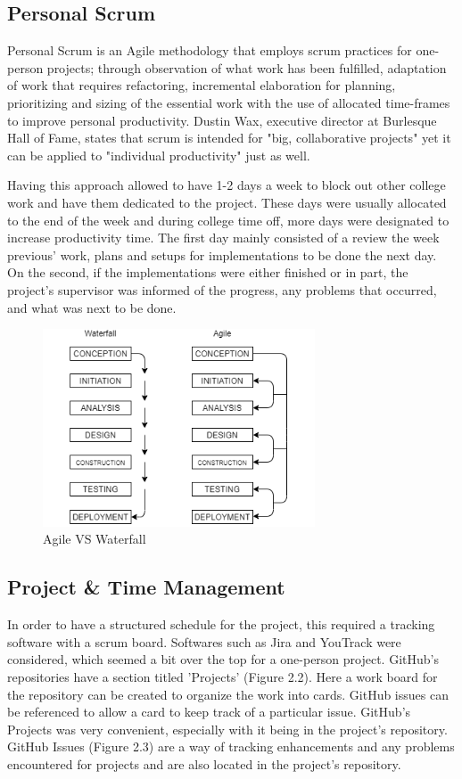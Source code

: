 \subsection{Personal Scrum}
Personal Scrum is an Agile methodology that employs scrum practices for one-person projects; through observation of what work has been fulfilled, adaptation of work that requires refactoring, incremental elaboration for planning, prioritizing and sizing of the essential work with the use of allocated time-frames to improve personal productivity. \cite{ref5}
Dustin Wax, executive director at Burlesque Hall of Fame, states that scrum is intended for "big, collaborative projects" yet it can be applied to "individual productivity" just as well. \cite{ref5}
 
Having this approach allowed to have 1-2 days a week to block out other college work and have them dedicated to the project. These days were usually allocated to the end of the week and during college time off, more days were designated to increase productivity time. The first day mainly consisted of a review the week previous' work, plans and setups for implementations to be done the next day. On the second, if the implementations were either finished or in part, the project's supervisor was informed of the progress, any problems that occurred, and what was next to be done.

\begin{figure}[H]
    \caption{Agile VS Waterfall}
    \label{image:agileVSwaterfall}
    \centering
    \includegraphics[width=0.72\textwidth]{images/misc/agile-vs-waterfall.png}
\end{figure}

\subsection{Project \& Time Management}
In order to have a structured schedule for the project, this required a tracking software with a scrum board. Softwares such as Jira and YouTrack were considered, which seemed a bit over the top for a one-person project. GitHub's repositories have a section titled 'Projects' (Figure 2.2). Here a work board for the repository can be created to organize the work into cards. GitHub issues can be referenced to allow a card to keep track of a particular issue. GitHub's Projects was very convenient, especially with it being in the project's repository. GitHub Issues (Figure 2.3) are a way of tracking enhancements and any problems encountered for projects and are also located in the project's repository.

